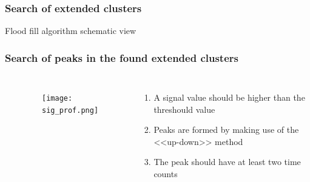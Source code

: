 \documentclass[svgnames] {beamer}
\begin{document}

 \begin{frame}
 	\frametitle{Search of extended clusters} \label{goBack}
 	\begin{block}{}
 		\centering Flood fill algorithm schematic view 
 	\end{block}
 	\begin{figure}[H]
 		\centering
 		\begin{minipage}[h]{0.24\linewidth}
 		\end{minipage}
 		\begin{minipage}[h]{0.24\linewidth}
 		\end{minipage}
 		\begin{minipage}[h]{0.24\linewidth}
 		\end{minipage}
 		\begin{minipage}[h]{0.24\linewidth}
 		\end{minipage}
 	\end{figure}
\end{frame}

\begin{frame}
	\frametitle{Search of peaks in the found extended clusters}
	\begin{columns}[c]
		\begin{block}{}
		\end{block}
		\begin{figure}[H]
			\texttt{[image: sig\_prof.png]}
		\end{figure}
{\small
		\begin{enumerate}
			\item A signal value should be higher than the threshould value 
			\item Peaks are formed by making use of the <<up-down>> method
			\item The peak should have at least two time counts 
		\end{enumerate}
}
	\end{columns}
\end{frame}
\end{document}
